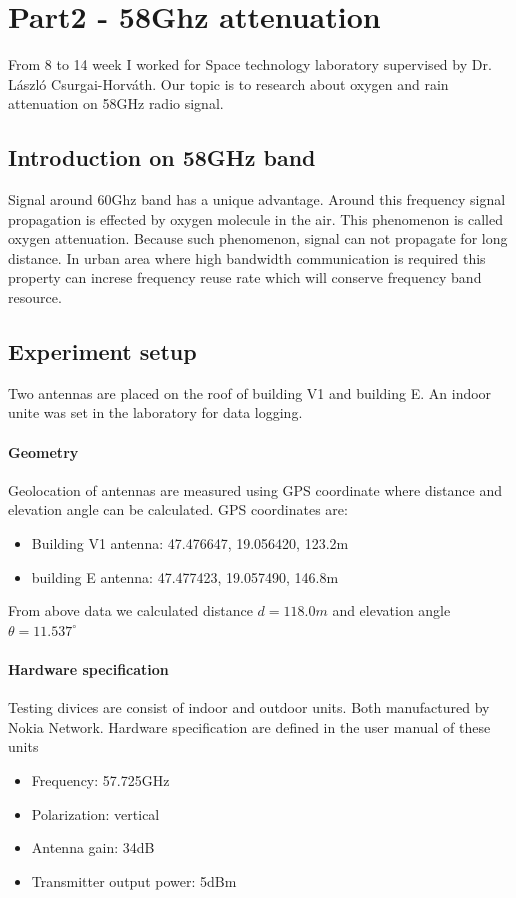 \newpage

\section{Part2 - 58Ghz attenuation}
From 8 to 14 week I worked for Space technology laboratory supervised by Dr. László Csurgai-Horváth.
Our topic is to research about oxygen and rain attenuation on 58GHz radio signal.

\subsection{Introduction on 58GHz band}
Signal around 60Ghz band has a unique advantage. Around this frequency
signal propagation is effected by oxygen molecule in the air. This phenomenon is 
called oxygen attenuation. Because such phenomenon, signal can not propagate for long distance.
In urban area where high bandwidth communication is required this property can increse
frequency reuse rate which will conserve frequency band resource.

\subsection{Experiment setup}
Two antennas are placed on the roof of building V1 and building E.
An indoor unite was set in the laboratory for data logging.

\paragraph{Geometry}
Geolocation of antennas are measured using GPS coordinate where distance and
elevation angle can be calculated.
GPS coordinates are:
\begin{itemize}
    \item Building V1 antenna: 47.476647, 19.056420, 123.2m
    \item building E antenna: 47.477423, 19.057490, 146.8m
\end{itemize}

From above data we calculated distance $d = 118.0m$ 
and elevation angle $\theta = 11.537^\circ$

\paragraph{Hardware specification}
Testing divices are consist of indoor and outdoor units. Both manufactured by 
Nokia Network. Hardware specification are 
defined in the user manual of these units \cite{metrohopper}
\begin{itemize}
    \item Frequency: 57.725GHz
    \item Polarization: vertical
    \item Antenna gain: 34dB
    \item Transmitter output power: 5dBm
\end{itemize}

